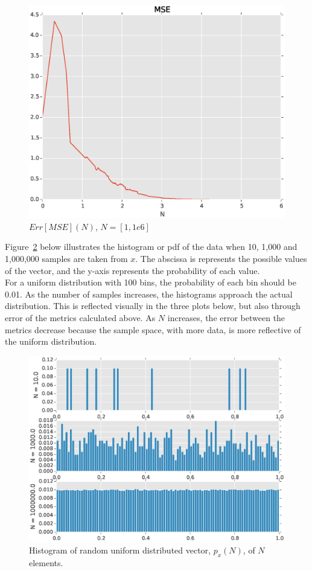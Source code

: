 \begin{figure}[H] 
	\centering 
	\includegraphics[width=\linewidth]{figure_3}
	\caption{$Err[MSE](N)$, $N = [1, 1e6]$}
	\label{fig: mse} 
\end{figure}

Figure~\ref{fig: hist} below illustrates the histogram or pdf of the data when 10, 1,000 and 1,000,000 samples are taken from $x$. The abscissa is represents the possible values of the vector, and the y-axis represents the probability of each value. \\


For a uniform distribution with 100 bins, the probability of each bin should be 0.01. As the number of samples increases, the histograms approach the actual distribution. This is reflected visually in the three plots below, but also through error of the metrics calculated above. As $N$ increases, the error between the metrics decrease because the sample space, with more data, is more reflective of the uniform distribution. 

\begin{figure}[H] 
	\centering 
	\includegraphics[width=\linewidth]{figure_4}
	\caption{Histogram of random uniform distributed vector, $p_x(N)$, of $N$ elements.}
	\label{fig: hist} 
\end{figure}

